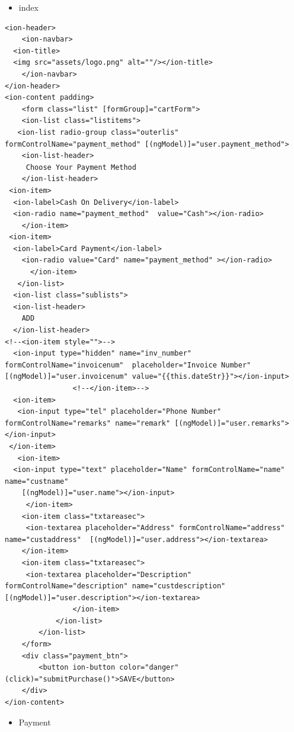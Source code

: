 \documentclass[a4paper,12pt]{article}
\begin{document}
\newpage
\begin{itemize} 
\item index
\end{itemize}
\begin{verbatim}
<ion-header>
    <ion-navbar>
  <ion-title>
  <img src="assets/logo.png" alt=""/></ion-title>
    </ion-navbar>
</ion-header>
<ion-content padding>
    <form class="list" [formGroup]="cartForm">
    <ion-list class="listitems">
   <ion-list radio-group class="outerlis"  formControlName="payment_method" [(ngModel)]="user.payment_method">
    <ion-list-header>
     Choose Your Payment Method
    </ion-list-header>
 <ion-item>
  <ion-label>Cash On Delivery</ion-label>
  <ion-radio name="payment_method"  value="Cash"></ion-radio>
    </ion-item>
 <ion-item>
  <ion-label>Card Payment</ion-label>
    <ion-radio value="Card" name="payment_method" ></ion-radio>
      </ion-item>
   </ion-list>
  <ion-list class="sublists">
  <ion-list-header>
    ADD 
  </ion-list-header>
<!--<ion-item style="">-->
  <ion-input type="hidden" name="inv_number" formControlName="invoicenum"  placeholder="Invoice Number" [(ngModel)]="user.invoicenum" value="{{this.dateStr}}"></ion-input>
                <!--</ion-item>-->
  <ion-item>
   <ion-input type="tel" placeholder="Phone Number"  formControlName="remarks" name="remark" [(ngModel)]="user.remarks"></ion-input>
 </ion-item>
   <ion-item>
  <ion-input type="text" placeholder="Name" formControlName="name"  name="custname"
    [(ngModel)]="user.name"></ion-input>
     </ion-item>
    <ion-item class="txtareasec">
     <ion-textarea placeholder="Address" formControlName="address" name="custaddress"  [(ngModel)]="user.address"></ion-textarea>
    </ion-item>
    <ion-item class="txtareasec">
     <ion-textarea placeholder="Description" formControlName="description" name="custdescription"  [(ngModel)]="user.description"></ion-textarea>
                </ion-item>
            </ion-list>
        </ion-list>
    </form>
    <div class="payment_btn">
        <button ion-button color="danger" (click)="submitPurchase()">SAVE</button>
    </div>
</ion-content>
\end{verbatim}
\begin{itemize} 
\item Payment
\end{itemize}
\end{document}
